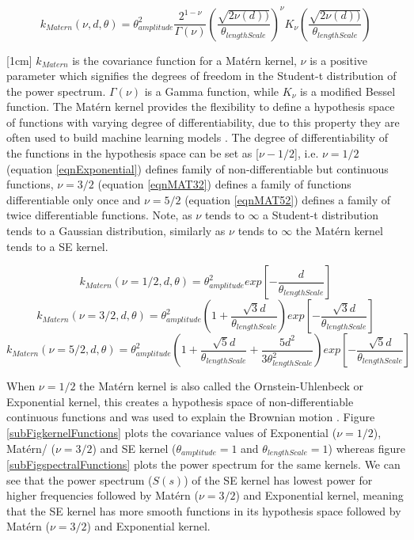 \begin{equation}
k_{Matern}(\nu, d, \theta) = \theta_{amplitude}^2\frac{2^{1- \nu }}{\Gamma (\nu)}\left ( \frac{\sqrt{2\nu(d))}}{\theta_{lengthScale}} \right )^{\nu}K_{\nu}\left ( \frac{\sqrt{2\nu(d))}}{\theta_{lengthScale}} \right)
\end{equation}

[1cm]
$k_{Matern}$ is the covariance function for a Mat\'ern kernel, $\nu$ is a positive parameter which signifies the degrees of freedom in the Student-t distribution of the power spectrum. $\Gamma (\nu)$ is a Gamma function, while $K_{\nu}$ is a modified Bessel function. The Mat\'ern kernel provides the flexibility to define a hypothesis space of functions with varying degree of differentiability, due to this property they are often used to build machine learning models \cite{minasny2005matern, cornford2002modelling}. The degree of differentiability of the functions in the hypothesis space can be set as [$\nu-1/2$], i.e.  $\nu = 1/2$ (equation \ref{eqnExponential}) defines family of non-differentiable but continuous functions, $\nu = 3/2$ (equation \ref{eqnMAT32}) defines a family of functions differentiable only once and $\nu = 5/2$ (equation \ref{eqnMAT52}) defines a family of twice differentiable functions. Note, as $\nu$ tends to $\infty$ a Student-t distribution tends to a Gaussian distribution, similarly as $\nu$ tends to $\infty$ the Mat\'ern kernel tends to a SE kernel. 

\begin{equation}\label{eqnExponential}
k_{Matern}(\nu = 1/2, d, \theta) = \theta_{amplitude}^2exp[-\frac{d}{\theta_{lengthScale}}]
\end{equation}
\begin{equation}\label{eqnMAT32}
k_{Matern}(\nu = 3/2, d, \theta) = \theta_{amplitude}^2 (1 + \frac{\sqrt{3}d}{\theta_{lengthScale}}) exp[-\frac{\sqrt{3}d}{\theta_{lengthScale}}]
\end{equation}
\begin{equation}\label{eqnMAT52}
k_{Matern}(\nu = 5/2, d, \theta) = \theta_{amplitude}^2(1 + \frac{\sqrt{5}d}{\theta_{lengthScale}} + \frac{5d^2}{3\theta_{lengthScale}^2})
exp[-\frac{\sqrt{5}d}{\theta_{lengthScale}}]
\end{equation}

When $\nu = 1/2$ the Mat\'ern kernel is also called the Ornstein-Uhlenbeck or Exponential kernel, this creates a hypothesis space of non-differentiable continuous functions and was used to explain the Brownian motion \cite{uhlenbeck1930theory}. Figure \ref{subFigkernelFunctions} plots the covariance values of Exponential ($\nu=1/2$), Mat\'ern/ ($\nu=3/2$) and SE kernel ($\theta_{amplitude} = 1$ and $\theta_{lengthScale} = 1$) whereas figure \ref{subFigspectralFunctions} plots the power spectrum for the same kernels. We can see that the power spectrum ($S(s)$) of the SE kernel has lowest power for higher frequencies followed by Mat\'ern ($\nu=3/2$) and Exponential kernel, meaning that the SE kernel has more smooth functions in its hypothesis space followed by Mat\'ern ($\nu=3/2$) and Exponential kernel. 


